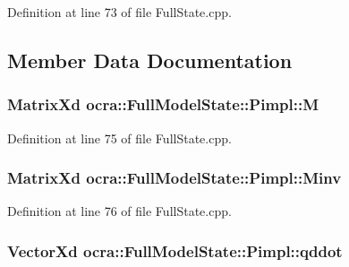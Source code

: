 Definition at line 73 of file Full\+State.\+cpp.



\subsection{Member Data Documentation}
\subsubsection[{\texorpdfstring{M}{M}}]{\setlength{\rightskip}{0pt plus 5cm}Matrix\+Xd ocra\+::\+Full\+Model\+State\+::\+Pimpl\+::M}\hypertarget{structocra_1_1FullModelState_1_1Pimpl_a0482896483cb287cfc1066df1326f250}{}\label{structocra_1_1FullModelState_1_1Pimpl_a0482896483cb287cfc1066df1326f250}


Definition at line 75 of file Full\+State.\+cpp.

\subsubsection[{\texorpdfstring{Minv}{Minv}}]{\setlength{\rightskip}{0pt plus 5cm}Matrix\+Xd ocra\+::\+Full\+Model\+State\+::\+Pimpl\+::\+Minv}\hypertarget{structocra_1_1FullModelState_1_1Pimpl_a66abf4494ddc5e7de0fbdeee4d6404d0}{}\label{structocra_1_1FullModelState_1_1Pimpl_a66abf4494ddc5e7de0fbdeee4d6404d0}


Definition at line 76 of file Full\+State.\+cpp.

\subsubsection[{\texorpdfstring{qddot}{qddot}}]{\setlength{\rightskip}{0pt plus 5cm}Vector\+Xd ocra\+::\+Full\+Model\+State\+::\+Pimpl\+::qddot}\hypertarget{structocra_1_1FullModelState_1_1Pimpl_a9575456409af57d39f990f2dda27c23f}{}\label{structocra_1_1FullModelState_1_1Pimpl_a9575456409af57d39f990f2dda27c23f}


